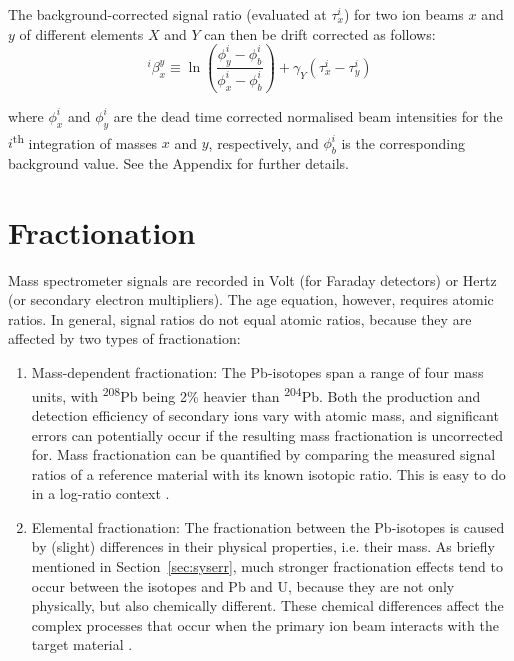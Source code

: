 \documentclass{article}
\begin{document}
The background-corrected signal ratio (evaluated at $\tau_x^i$) for
two ion beams $x$ and $y$ of different elements $X$ and $Y$ can then
be drift corrected as follows:
\begin{equation}
{}^{i}\!\beta^{y}_{x} \equiv
\ln\!\left(\frac{\phi^i_y-\phi^i_b}{\phi^i_x-\phi^i_b}\right) +
\gamma_Y\left(\tau_x^i-\tau_y^i\right)
  \label{eq:betadrift}
\end{equation}

\noindent where $\phi^i_x$ and $\phi^i_y$ are the dead time corrected
normalised beam intensities for the $i$\textsuperscript{th}
integration of masses $x$ and $y$, respectively, and $\phi^i_b$ is the
corresponding background value. See the Appendix for further details.

\section{Fractionation}
\label{sec:fractionation}

Mass spectrometer signals are recorded in Volt (for Faraday detectors)
or Hertz (or secondary electron multipliers). The age equation,
however, requires atomic ratios. In general, signal ratios do not
equal atomic ratios, because they are affected by two types of
fractionation:

\begin{enumerate}
\item{Mass-dependent fractionation:} The Pb-isotopes span a range of
  four mass units, with \textsuperscript{208}Pb being 2\% heavier than
  \textsuperscript{204}Pb. Both the production and detection
  efficiency of secondary ions vary with atomic mass, and significant
  errors can potentially occur if the resulting mass fractionation is
  uncorrected for. Mass fractionation can be quantified by comparing
  the measured signal ratios of a reference material with its known
  isotopic ratio. This is easy to do in a log-ratio context
  \citep{vermeesch2015b}.
\item{Elemental fractionation:} The fractionation between the
  Pb-isotopes is caused by (slight) differences in their physical
  properties, i.e. their mass. As briefly mentioned in
  Section~\ref{sec:syserr}, much stronger fractionation effects tend
  to occur between the isotopes and Pb and U, because they are not
  only physically, but also chemically different. These chemical
  differences affect the complex processes that occur when the primary
  ion beam interacts with the target material \citep{williams1998}.
\end{enumerate}
\end{document}
